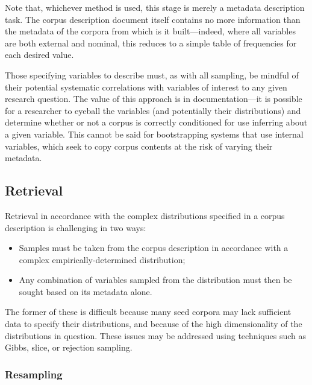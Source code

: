 Note that, whichever method is used, this stage is merely a metadata description task.  The corpus description document itself contains no more information than the metadata of the corpora from which is it built---indeed, where all variables are both external and nominal, this reduces to a simple table of frequencies for each desired value.  

Those specifying variables to describe must, as with all sampling, be mindful of their potential systematic correlations with variables of interest to any given research question.  The value of this approach is in documentation---it is possible for a researcher to eyeball the variables (and potentially their distributions) and determine whether or not a corpus is correctly conditioned for use inferring about a given variable.  This cannot be said for bootstrapping systems that use internal variables, which seek to copy corpus contents at the risk of varying their metadata.



\subsection{Retrieval}
Retrieval in accordance with the complex distributions specified in a corpus description is challenging in two ways:

\begin{itemize}
    \item Samples must be taken from the corpus description in accordance with a complex empirically-determined distribution;
    \item Any combination of variables sampled from the distribution must then be sought based on its metadata alone.
\end{itemize}

The former of these is difficult because many seed corpora may lack sufficient data to specify their distributions, and because of the high dimensionality of the distributions in question.  These issues may be addressed using techniques such as Gibbs, slice, or rejection sampling.  



\subsubsection{Resampling}




